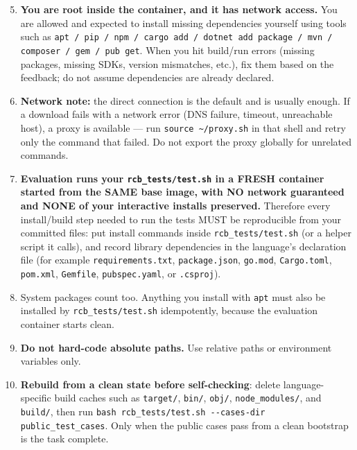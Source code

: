 \begin{promptbox}
\begin{enumerate}
\setcounter{enumi}{4}
\item \textbf{You are root inside the container, and it has network access.} You are allowed and expected to install missing dependencies yourself using tools such as \texttt{apt / pip / npm / cargo add / dotnet add package / mvn / composer / gem / pub get}. When you hit build/run errors (missing packages, missing SDKs, version mismatches, etc.), fix them based on the feedback; do not assume dependencies are already declared.
\item \textbf{Network note:} the direct connection is the default and is usually enough. If a download fails with a network error (DNS failure, timeout, unreachable host), a proxy is available --- run \texttt{source \textasciitilde/proxy.sh} in that shell and retry only the command that failed. Do not export the proxy globally for unrelated commands.
\item \textbf{Evaluation runs your \texttt{rcb\_tests/test.sh} in a FRESH container started from the SAME base image, with NO network guaranteed and NONE of your interactive installs preserved.} Therefore every install/build step needed to run the tests MUST be reproducible from your committed files: put install commands inside \texttt{rcb\_tests/test.sh} (or a helper script it calls), and record library dependencies in the language's declaration file (for example \texttt{requirements.txt}, \texttt{package.json}, \texttt{go.mod}, \texttt{Cargo.toml}, \texttt{pom.xml}, \texttt{Gemfile}, \texttt{pubspec.yaml}, or \texttt{.csproj}).
\item System packages count too. Anything you install with \texttt{apt} must also be installed by \texttt{rcb\_tests/test.sh} idempotently, because the evaluation container starts clean.
\item \textbf{Do not hard-code absolute paths.} Use relative paths or environment variables only.
\item \textbf{Rebuild from a clean state before self-checking}: delete language-specific build caches such as \texttt{target/}, \texttt{bin/}, \texttt{obj/}, \texttt{node\_modules/}, and \texttt{build/}, then run \texttt{bash rcb\_tests/test.sh -{}-cases-dir public\_test\_cases}. Only when the public cases pass from a clean bootstrap is the task complete.
\end{enumerate}
\end{promptbox}
